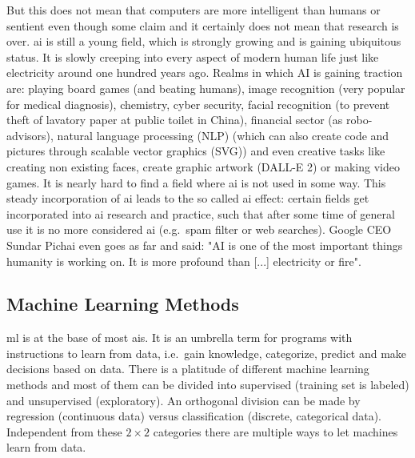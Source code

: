 But this does not mean that computers are more intelligent than humans or \linebreak[4] sentient\cite{searle1980,searle1999married} even though some claim\cite{tiku2022google} and it certainly does not mean that research is over. 
\Gls{ai} is still a young field, which is strongly growing and is gaining ubiquitous status. 
It is slowly creeping into every aspect of modern human life just like electricity around one hundred years ago. 
Realms in which AI is gaining traction are: 
%
playing board games (and beating humans)\cite{Silver2017,Feng1999,Campbell2002}, 
image recognition (very popular for medical diagnosis)\cite{Li2020,Deo2015,Topol2019,Fujiyoshi2019}, 
chemistry\cite{Westermayr2019,goh2017chemception,jha2018elemnet}, 
cyber security\cite{Sarker2021},
facial recognition (to prevent theft of lavatory paper at public toilet in China\cite{Andrews2017}),
financial sector (as robo-advisors)\cite{Littman2021},
natural language processing (NLP)\cite{Koroteev2021,Liu2021gpt,Parviainen2021} 
(which can also create code and pictures through scalable vector graphics (SVG))
and even creative tasks like 
creating non existing faces\cite{Mansourifar2020}, 
create graphic artwork (DALL-E 2)\cite{Marcus2022} or 
making video games\cite{Guzdial2016}.
%
It is nearly hard to find a field where \gls{ai} is not used in some way. 
This steady incorporation of \gls{ai} leads to the so called \gls{ai} effect\cite{McCorduck1982,ai100}: 
certain fields get incorporated into \gls{ai} research and practice,
such that after some time of general use it is no more considered \gls{ai} (e.g.\ spam filter or web searches).
Google CEO Sundar Pichai even goes as far and said: 
"AI is one of the most important things humanity is working on. It is more profound than [...] electricity or fire"\cite{Hassan2020}.

%
\subsection{Machine Learning Methods}
\label{sec:ml-methods}
%
\Gls{ml} is at the base of most \gls{ai}s.
It is an umbrella term for programs with instructions to learn from data, i.e.\ gain knowledge, categorize, predict and make decisions based on data. 
%
There is a platitude of different machine learning methods and most of them can be divided into supervised (training set is labeled) and unsupervised (exploratory).  
An orthogonal division can be made by regression (continuous data) versus classification (discrete, categorical data). 
Independent from these $2\times2$ categories there are multiple ways to let machines learn from data.

